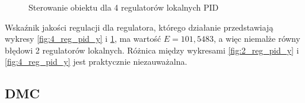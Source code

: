 \begin{figure}[H]
\centering
{}
\caption{Sterowanie obiektu dla 4 regulatorów lokalnych PID}
\label{fig:4_reg_pid_u}
\end{figure}

Wskaźnik jakości regulacji dla regulatora, którego działanie przedstawiają wykresy \ref{fig:4_reg_pid_y} i \ref{fig:4_reg_pid_u}, ma wartość $E=101,5483$, a więc niemalże równy błędowi 2 regulatorów lokalnych. Różnica między wykresami \ref{fig:2_reg_pid_y} i \ref{fig:4_reg_pid_y} jest praktycznie niezauważalna.
\subsection{DMC}